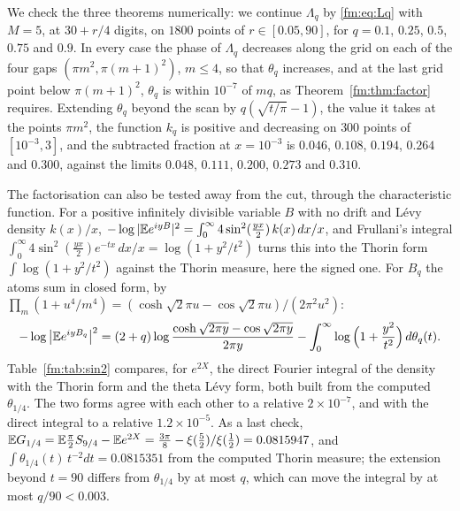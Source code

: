 We check the three theorems numerically: we continue $\Lambda_q$ by \eqref{fm:eq:Lq} with $M=5$, at $30+r/4$ digits, on $1800$ points of $r\in[0.05,90]$, for $q=0.1$, $0.25$, $0.5$, $0.75$ and $0.9$. In every case the phase of $\Lambda_q$ decreases along the grid on each of the four gaps $(\pi m^2,\pi(m+1)^2)$, $m\le4$, so that $\theta_q$ increases, and at the last grid point below $\pi(m+1)^2$, $\theta_q$ is within $10^{-7}$ of $mq$, as Theorem~\ref{fm:thm:factor} requires. Extending $\theta_q$ beyond the scan by $q(\sqrt{t/\pi}-1)$, the value it takes at the points $\pi m^2$, the function $k_q$ is positive and decreasing on $300$ points of $[10^{-3},3]$, and the subtracted fraction at $x=10^{-3}$ is $0.046$, $0.108$, $0.194$, $0.264$ and $0.300$, against the limits $0.048$, $0.111$, $0.200$, $0.273$ and $0.310$.

The factorisation can also be tested away from the cut, through the characteristic function. For a positive infinitely divisible variable $B$ with no drift and L\'evy density $k(x)/x$, $-\log|\mathbb{E} e^{iyB}|^2=\int_0^\infty4\sin^2(\frac{yx}2)\,k(x)\,dx/x$, and Frullani's integral $\int_0^\infty4\sin^2(\frac{yx}2)e^{-tx}\,dx/x=\log(1+y^2/t^2)$ turns this into the Thorin form $\int\log(1+y^2/t^2)$ against the Thorin measure, here the signed one. For $B_q$ the atoms sum in closed form, by $\prod_m(1+u^4/m^4)=(\cosh\sqrt2\pi u-\cos\sqrt2\pi u)/(2\pi^2u^2)$:
\[
-\log\big|\mathbb{E} e^{iyB_q}\big|^2=(2+q)\log\frac{\cosh\sqrt{2\pi y}-\cos\sqrt{2\pi y}}{2\pi y}-\int_0^\infty\log\Big(1+\frac{y^2}{t^2}\Big)\,d\theta_q(t).
\]
Table~\ref{fm:tab:sin2} compares, for $e^{2X}$, the direct Fourier integral of the density with the Thorin form and the theta L\'evy form, both built from the computed $\theta_{1/4}$. The two forms agree with each other to a relative $2\times10^{-7}$, and with the direct integral to a relative $1.2\times10^{-5}$. As a last check, $\mathbb{E} G_{1/4}=\mathbb{E}\frac\pi2S_{9/4}-\mathbb{E} e^{2X}=\frac{3\pi}8-\xi(\frac52)/\xi(\frac12)=0.0815947$, and $\int\theta_{1/4}(t)\,t^{-2}dt=0.0815351$ from the computed Thorin measure; the extension beyond $t=90$ differs from $\theta_{1/4}$ by at most $q$, which can move the integral by at most $q/90<0.003$.


